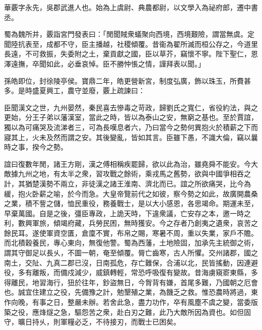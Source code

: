 \begin{pinyinscope}
 
 
 華覈字永先，吳郡武進人也。始為上虞尉、典農都尉，以文學入為祕府郎，遷中書丞。
 
 
 
 
 蜀為魏所并，覈詣宮門發表曰：「閒聞賊衆蟻聚向西境，西境艱險，謂當無虞。定聞陸抗表至，成都不守，臣主播越，社稷傾覆。昔衞為翟所滅而桓公存之，今道里長遠，不可救振，失委附之土，棄貢獻之國，臣以草芥，竊懷不寧。陛下聖仁，恩澤遠撫，卒聞如此，必垂哀悼。臣不勝忡悵之情，謹拜表以聞。」
 
 
 
 
 孫皓即位，封徐陵亭侯。寶鼎二年，皓更營新宮，制度弘廣，飾以珠玉，所費甚多。是時盛夏興工，農守並廢，覈上疏諫曰：
 
 
 
 
 臣聞漢文之世，九州晏然，秦民喜去慘毒之苛政，歸劉氏之寬仁，省役約法，與之更始，分王子弟以藩漢室，當此之時，皆以為泰山之安，無窮之基也。至於賈誼，獨以為可痛哭及流涕者三，可為長嘆息者六，乃曰當今之勢何異抱火於積薪之下而寢其上，火未及然而謂之安。其後變亂，皆如其言。臣雖下愚，不識大倫，竊以曩時之事，揆今之勢。
 
 
 
 
 誼曰復數年閒，諸王方剛，漢之傅相稱疾罷歸，欲以此為治，雖堯舜不能安。今大敵據九州之地，有太半之衆，習攻戰之餘術，乘戎馬之舊勢，欲與中國爭相吞之計，其猶楚漢勢不兩立，非徒漢之諸王淮南、濟北而已。誼之所欲痛哭，比今為緩，抱火卧薪之喻，於今而急。大皇帝覽前代之如彼，察今勢之如此，故廣開農桑之業，積不訾之儲，恤民重役，務養戰士，是以大小感恩，各思竭命。期運未至，早棄萬國。自是之後，彊臣專政，上詭天時，下違衆議，亡安存之本，邀一時之利，數興軍旅，傾竭府藏，兵勞民困，無時獲安。今之存者乃創夷之遺衆，哀苦之餘民耳。遂使軍資空匱，倉廩不實，布帛之賜，寒暑不周，重以失業，家戶不贍。而北積穀養民，專心東向，無復他警。蜀為西藩，土地險固，加承先主統御之術，謂其守御足以長乆，不圖一朝，奄至傾覆。脣亡齒寒，古人所懼。交州諸郡，國之南土，交阯、九真二郡已沒，日南孤危，存亡難保，合浦以北，民皆搖動，因連避役，多有離叛，而備戍減少，威鎮轉輕，常恐呼吸復有變故。昔海虜窺窬東縣，多得離民，地習海行，狃於往年，鈔盜無日，今胷背有嫌，首尾多難，乃國朝之厄會也。誠宜住建立之役，先備豫之計，勉墾殖之業，為饑乏之救。惟恐農時將過，東作向晚，有事之日，整嚴未辦。若舍此急，盡力功作，卒有風塵不虞之變，當委版築之役，應烽燧之急，驅怨苦之衆，赴白刃之難，此乃大敵所因為資也。如但固守，曠日持乆，則軍糧必乏，不待接刃，而戰士已困矣。
 
 
 

\end{pinyinscope}
